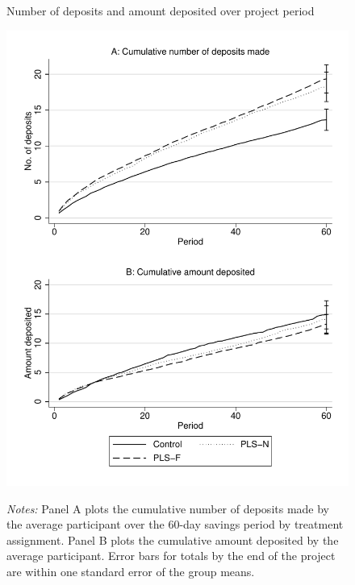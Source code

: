 \documentclass[11pt]{article}
\begin{document}
		\begin{figure}[ht]
			\caption{Number of deposits and amount deposited over project period}
			\includegraphics[height=0.85\textheight]{../../figures/line-cumdeposits.pdf}
			\label{fig:line-cumdeposits}
			\caption*{\footnotesize \emph{Notes:} Panel A plots the cumulative number of deposits made by the average participant over the 60-day savings period by treatment assignment. Panel B plots the cumulative amount deposited by the average participant. Error bars for totals by the end of the project are within one standard error of the group means.}
		\end{figure}

		\clearpage

\end{document}
